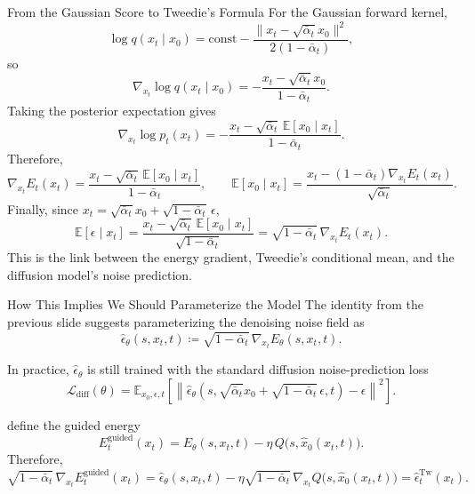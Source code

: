 \documentclass[aspectratio=169,11pt]{beamer}
\begin{document}
 \begin{frame}{From the Gaussian Score to Tweedie's Formula}
 \small
 For the Gaussian forward kernel,
 \[
 \log q(x_t\mid x_0)=\mathrm{const}-\frac{\|x_t-\sqrt{\bar\alpha_t}x_0\|^2}{2(1-\bar\alpha_t)},
 \]
 so
 \[
 \nabla_{x_t}\log q(x_t\mid x_0)
 = -\frac{x_t-\sqrt{\bar\alpha_t}x_0}{1-\bar\alpha_t}.
 \]
 Taking the posterior expectation gives
 \[
 \nabla_{x_t}\log p_t(x_t)
 = -\frac{x_t-\sqrt{\bar\alpha_t}\,\mathbb{E}[x_0\mid x_t]}{1-\bar\alpha_t}.
 \]
 Therefore,
 \[
 \nabla_{x_t}E_t(x_t)
 = \frac{x_t-\sqrt{\bar\alpha_t}\,\mathbb{E}[x_0\mid x_t]}{1-\bar\alpha_t},
 \qquad
 \mathbb{E}[x_0\mid x_t]
 = \frac{x_t-(1-\bar\alpha_t)\nabla_{x_t}E_t(x_t)}{\sqrt{\bar\alpha_t}}.
 \]
 Finally, since $x_t=\sqrt{\bar\alpha_t}x_0+\sqrt{1-\bar\alpha_t}\,\epsilon$,
 \[
 \mathbb{E}[\epsilon\mid x_t]
 = \frac{x_t-\sqrt{\bar\alpha_t}\,\mathbb{E}[x_0\mid x_t]}{\sqrt{1-\bar\alpha_t}}
 = \sqrt{1-\bar\alpha_t}\,\nabla_{x_t}E_t(x_t).
 \]
 This is the link between the energy gradient, Tweedie's conditional mean, and the diffusion model's noise prediction.
 \end{frame}

 \begin{frame}{How This Implies We Should Parameterize the Model}
 \small
 The identity from the previous slide suggests parameterizing the denoising noise field as
 \[
 \hat\epsilon_\theta(s,x_t,t)\coloneqq\sqrt{1-\bar\alpha_t}\,\nabla_{x_t}E_\theta(s,x_t,t).
 \]

 In practice, $\hat\epsilon_\theta$ is still trained with the standard diffusion noise-prediction loss
 \[
 \mathcal{L}_{\mathrm{diff}}(\theta)=\mathbb{E}_{x_0,\epsilon,t}\left[\left\lVert \hat\epsilon_\theta\!\left(s,\sqrt{\bar\alpha_t}x_0+\sqrt{1-\bar\alpha_t}\,\epsilon,t\right)-\epsilon\right\rVert^2\right].
 \]

 define the guided energy
 \[
 E_t^{\mathrm{guided}}(x_t)=E_\theta(s,x_t,t)-\eta\,Q\bigl(s,\hat x_0(x_t,t)\bigr).
 \]
 Therefore,
 \[
 \sqrt{1-\bar\alpha_t}\,\nabla_{x_t}E_t^{\mathrm{guided}}(x_t)
 = \hat\epsilon_\theta(s,x_t,t)-\eta\sqrt{1-\bar\alpha_t}\,\nabla_{x_t}Q\bigl(s,\hat x_0(x_t,t)\bigr)
 = \hat\epsilon_t^{\mathrm{Tw}}(x_t).
 \]
 \end{frame}
\end{document}
